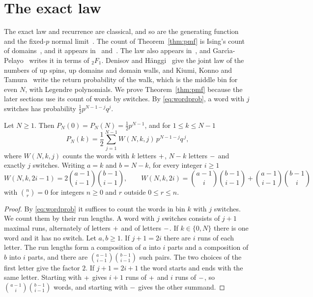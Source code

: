 \section{The exact law}\label{sec:exact}

The exact law and recurrence are classical, and so are the generating
function~\cite[Eq.~(3.1)]{gillis1955} and the fixed-$p$ normal
limit~\cite[Theorem~6]{konno2009}. The count of Theorem~\ref{thm:pmf} is
Ising's count of domains~\cite{ising1925}, and it appears
in~\cite[Eq.~(44)]{antal2004} and~\cite[Eqs.~(A15) to (A18)]{dantchev2022}.
The law also appears in~\cite[Proposition~4.1 and Eq.~(4.1)]{dekkingkong2011}, and
Garc\'{\i}a-Pelayo~\cite[Eq.~(14)]{garciapelayo2009} writes it in terms of ${}_2F_1$.
Denisov and H\"anggi~\cite[Eq.~(3.6)]{denisov2005} give the joint law of the
numbers of up spins, up domains and domain walls, and Kiumi, Konno and
Tamura~\cite[Proposition~3]{kiumi2022} write the return probability of the
walk, which is the middle bin for even $N$, with Legendre polynomials.
We prove Theorem~\ref{thm:pmf} because the later sections use its count of
words by switches. By \eqref{eq:wordprob}, a word with $j$ switches has
probability $\frac12p^{N-1-j}q^j$.

\begin{theorem}\label{thm:pmf}
Let $N\ge1$. Then $P_N(0)=P_N(N)=\tfrac12p^{N-1}$, and for $1\le k\le N-1$
\[
P_N(k)=\frac12\sum_{j=1}^{N-1}W(N,k,j)\,p^{N-1-j}q^{\,j},
\]
where $W(N,k,j)$ counts the words with $k$ letters $\mathord{+}$, $N-k$ letters $\mathord{-}$
and exactly $j$ switches. Writing $a=k$ and $b=N-k$, for every integer $i\ge1$
\[
W(N,k,2i-1)=2\binom{a-1}{i-1}\binom{b-1}{i-1},\qquad
W(N,k,2i)=\binom{a-1}{i}\binom{b-1}{i-1}+\binom{a-1}{i-1}\binom{b-1}{i}
\]
with $\binom nr=0$ for integers $n\ge0$ and $r$ outside $0\le r\le n$.
\end{theorem}

\begin{proof}
By \eqref{eq:wordprob} it suffices to count the words in bin $k$ with $j$
switches. We count them by their run lengths. A word with $j$ switches
consists of $j+1$ maximal runs, alternately of letters $\mathord{+}$ and of letters
$\mathord{-}$. If $k\in\{0,N\}$ there is one word and it has no switch. Let $a,b\ge1$.
If $j+1=2i$ there are $i$ runs of each letter. The run lengths form a
composition of $a$ into $i$ parts and a composition of $b$ into $i$ parts, and
there are $\binom{a-1}{i-1}\binom{b-1}{i-1}$ such pairs. The two choices of the
first letter give the factor $2$. If
$j+1=2i+1$ the word starts and ends with the same letter. Starting with $\mathord{+}$
gives $i+1$ runs of $\mathord{+}$ and $i$ runs of $\mathord{-}$, so
$\binom{a-1}{i}\binom{b-1}{i-1}$ words, and starting with $\mathord{-}$ gives the
other summand.
\end{proof}


